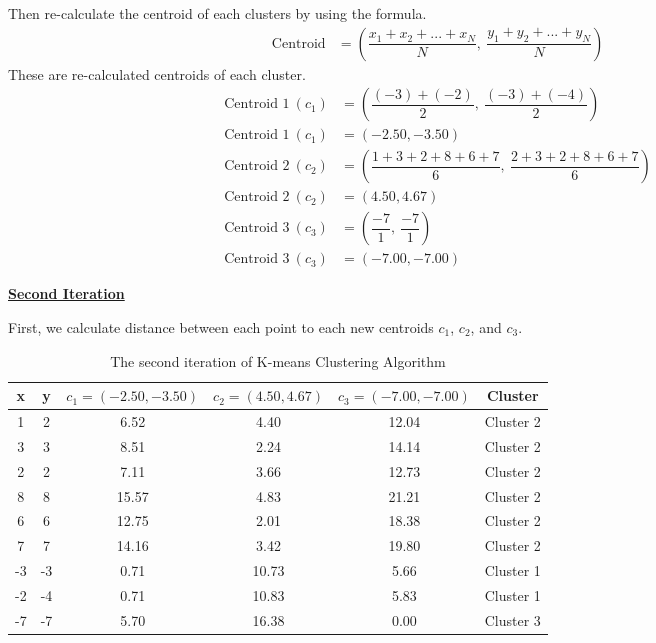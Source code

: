 \documentclass[12pt, a4paper]{article}
\begin{document}
\begin{enumerate}
            Then re-calculate the centroid of each clusters by using the formula.
            \begin{align*}
                \text{Centroid} & = \left( \dfrac{x_{1} + x_{2} + ... + x_{N}}{N}, \ \dfrac{y_{1} + y_{2} + ... + y_{N}}{N} \right)
            \end{align*}
            These are re-calculated centroids of each cluster.
            \begin{align*}
                \text{Centroid 1}\ (c_{1}) & = \left( \dfrac{(-3) + (-2)}{2},\ \dfrac{(-3) + (-4)}{2} \right) \\
                \text{Centroid 1}\ (c_{1}) & = (-2.50, -3.50) \\[0.75em]
                \text{Centroid 2}\ (c_{2}) & = \left( \dfrac{1 + 3 + 2 + 8 + 6 + 7}{6},\ \dfrac{2 + 3 + 2 + 8 + 6 + 7}{6} \right) \\
                \text{Centroid 2}\ (c_{2}) & = (4.50, 4.67) \\[0.75em]
                \text{Centroid 3}\ (c_{3}) & = \left( \dfrac{-7}{1},\ \dfrac{-7}{1} \right) \\
                \text{Centroid 3}\ (c_{3}) & = (-7.00, -7.00)
            \end{align*}
        \pagebreak

            \underline{\textbf{Second Iteration}}

            First, we calculate distance between each point to each new centroids $c_{1}$, $c_{2}$, and $c_{3}$.
            \begin{table}[h]
                \centering
                \caption{The second iteration of K-means Clustering Algorithm}
                \begin{tabular}{|c|c|c|c|c|c|}
                    \hline
                    \rule{0pt}{2.5ex}
                    x & y & $c_{1} = (-2.50, -3.50)$ & $c_{2} = (4.50, 4.67)$ & $c_{3} = (-7.00, -7.00)$ & Cluster \\
                    \hline
                    1 & 2 & 6.52 & 4.40 & 12.04 & Cluster 2 \\
                    3 & 3 & 8.51 & 2.24 & 14.14 & Cluster 2 \\
                    2 & 2 & 7.11 & 3.66 & 12.73 & Cluster 2 \\
                    8 & 8 & 15.57 & 4.83 & 21.21 & Cluster 2 \\
                    6 & 6 & 12.75 & 2.01 & 18.38 & Cluster 2 \\
                    7 & 7 & 14.16 & 3.42 & 19.80 & Cluster 2 \\
                    -3 & -3 & 0.71 & 10.73 & 5.66 & Cluster 1 \\
                    -2 & -4 & 0.71 & 10.83 & 5.83 & Cluster 1 \\
                    -7 & -7 & 5.70 & 16.38 & 0.00 & Cluster 3 \\
                    \hline
                \end{tabular}
            \end{table}


\end{enumerate}
\end{document}
